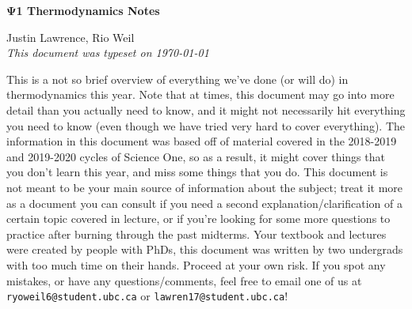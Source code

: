 \documentclass[12pt]{article}
\begin{document}
\begin{tcolorbox}
  \begin{center}
  \begin{Large}
    \textbf{$\boldsymbol{\Psi}$1 Thermodynamics Notes} \\
    \vspace{5pt}
  \end{Large}
  \begin{large}
        Justin Lawrence, Rio Weil \\
\vspace{5pt}
    \emph{This document was typeset on \today}
  \end{large}
  \end{center}
\end{tcolorbox}
\begin{center}
This is a not so brief overview of everything we've done (or will do) in thermodynamics this year. Note that at times, this document may go into more detail than you actually need to know, and it might not necessarily hit everything you need to know (even though we have tried very hard to cover everything). The information in this document was based off of material covered in the 2018-2019 and 2019-2020 cycles of Science One, so as a result, it might cover things that you don't learn this year, and miss some things that you do. This document is not meant to be your main source of information about the subject; treat it more as a document you can consult if you need a second explanation/clarification of a certain topic covered in lecture, or if you're looking for some more questions to practice after burning through the past midterms. Your textbook and lectures were created by people with PhDs, this document was written by two undergrads with too much time on their hands. Proceed at your own risk.
\newline
\newline
If you spot any mistakes, or have any questions/comments, feel free to email one of us at {\tt ryoweil6@student.ubc.ca} or {\tt lawren17@student.ubc.ca}!
\end{center}
\newpage
\tableofcontents
\newpage

\newpage

\newpage

\newpage

\end{document}
